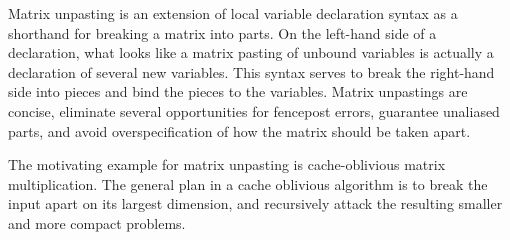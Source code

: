 Matrix unpasting is an extension of local variable declaration syntax as a
shorthand for breaking a matrix into parts.  On the left-hand side of
a declaration, what looks like a matrix pasting of unbound variables
is actually a declaration of several new variables.
This syntax
serves to break the right-hand side into pieces and bind the pieces to
the variables.  Matrix unpastings are concise, eliminate several
opportunities for fencepost errors, guarantee unaliased parts, and
avoid overspecification of how the matrix should be taken apart.

The motivating example for matrix unpasting is cache-oblivious
matrix multiplication.  The general plan in a cache oblivious
algorithm is to break the input apart on its largest dimension,
and recursively attack the resulting smaller and more compact
problems.

